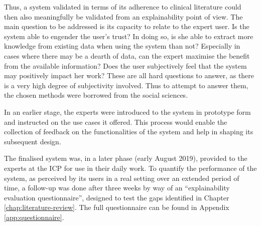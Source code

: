 Thus, a system validated in terms of its adherence to clinical literature could then also meaningfully be validated from an explainability point of view.
The main question to be addressed is its capacity to relate to the expert user.
Is the system able to engender the user's trust?
In doing so, is she able to extract more knowledge from existing data when using the system than not?
Especially in cases where there may be a dearth of data, can the expert maximise the benefit from the available information?
Does the user subjectively feel that the system may positively impact her work?
These are all hard questions to answer, as there is a very high degree of subjectivity involved.
Thus to attempt to answer them, the chosen methods were borrowed from the social sciences.

In an earlier stage, the experts were introduced to the system in prototype form and instructed on the use cases it offered.
This process would enable the collection of feedback on the functionalities of the system and help in shaping its subsequent design.

The finalised system was, in a later phase (early August 2019), provided to the experts at the ICP for use in their daily work.
To quantify the performance of the system, as perceived by its users in a real setting over an extended period of time, a follow-up was done after three weeks by way of an \enquote{explainability evaluation questionnaire}, designed to test the gaps identified in Chapter \ref{chap:literature-review}.
The full questionnaire can be found in Appendix \ref{app:questionnaire}.


